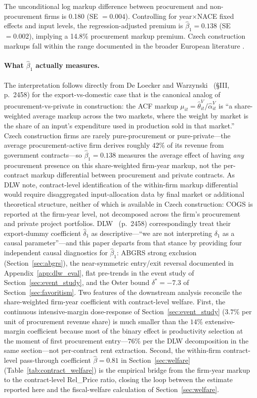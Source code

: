 \documentclass[11pt]{article}
\begin{document}
The unconditional log markup difference between procurement and non-procurement firms is 0.180 (SE $= 0.004$). Controlling for year$\times$NACE fixed effects and input levels, the regression-adjusted premium is $\hat{\beta}_1 = 0.138$ (SE $= 0.002$), implying a 14.8\% procurement markup premium. Czech construction markups fall within the range documented in the broader European literature \cite{DiezLeighTambunlertchai2018}.

\paragraph{What $\hat{\beta}_1$ actually measures.} The interpretation follows directly from De Loecker and Warzynski \cite{DLW2012}~(\S III, p.~2458) for the export-vs-domestic case that is the canonical analog of procurement-vs-private in construction: the ACF markup $\hat{\mu}_{it} = \hat{\theta}^V_{it}/\hat{\alpha}^V_{it}$ is ``a share-weighted average markup across the two markets, where the weight by market is the share of an input's expenditure used in production sold in that market.'' Czech construction firms are rarely pure-procurement or pure-private---the average procurement-active firm derives roughly $42\%$ of its revenue from government contracts---so $\hat{\beta}_1 = 0.138$ measures the average effect of having \emph{any} procurement presence on this share-weighted firm-year markup, not the per-contract markup differential between procurement and private contracts. As DLW note, contract-level identification of the within-firm markup differential would require disaggregated input-allocation data by final market or additional theoretical structure, neither of which is available in Czech construction: COGS is reported at the firm-year level, not decomposed across the firm's procurement and private project portfolios. DLW \cite{DLW2012}~(p.~2458) correspondingly treat their export-dummy coefficient $\hat{\delta}_1$ as descriptive---``we are not interpreting $\delta_1$ as a causal parameter''---and this paper departs from that stance by providing four independent causal diagnostics for $\hat{\beta}_1$: ABGRS strong exclusion (Section~\ref{sec:abgrs}), the near-symmetric entry/exit reversal documented in Appendix~\ref{app:dlw_eval}, flat pre-trends in the event study of Section~\ref{sec:event_study}, and the Oster bound $\delta^* = -7.3$ of Section~\ref{sec:favoritism}. Two features of the downstream analysis reconcile the share-weighted firm-year coefficient with contract-level welfare. First, the continuous intensive-margin dose-response of Section~\ref{sec:event_study} ($3.7\%$ per unit of procurement revenue share) is much smaller than the $14\%$ extensive-margin coefficient because most of the binary effect is productivity selection at the moment of first procurement entry---$76\%$ per the DLW decomposition in the same section---not per-contract rent extraction. Second, the within-firm contract-level pass-through coefficient $\hat{\beta} = 0.81$ in Section~\ref{sec:welfare} (Table~\ref{tab:contract_welfare}) is the empirical bridge from the firm-year markup to the contract-level Rel\_Price ratio, closing the loop between the estimate reported here and the fiscal-welfare calculation of Section~\ref{sec:welfare}.
\end{document}
